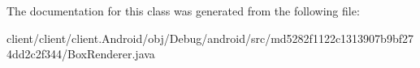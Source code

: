 The documentation for this class was generated from the following file\+:\begin{DoxyCompactItemize}
\item 
client/client/client.\+Android/obj/\+Debug/android/src/md5282f1122c1313907b9bf274dd2c2f344/Box\+Renderer.\+java\end{DoxyCompactItemize}

